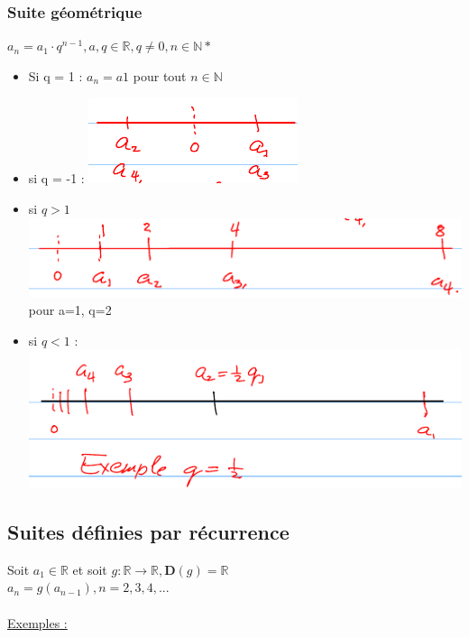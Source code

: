 \documentclass[12pt,a4paper]{article}
\newcommand{\R}{\ensuremath{\mathbb{R}} }
\newcommand{\N}{\ensuremath{\mathbb{N}} }
\begin{document}
{\subsubsection{Suite géométrique}
$a_n = a_1 \cdot q^{n-1}, a,q\in \R, q \neq 0, n\in \mathbb{N*}$
\begin{itemize}
\item Si q = 1 : $a_n = a1$ pour tout $n \in \N$
\item si q = -1 : \includegraphics[scale=0.5]{illustrations_Analyse/suite_geometrique}
\item si $q > 1 $ \includegraphics[scale=0.5]{illustrations_Analyse/suite_geometrique_geq_1} pour a=1, q=2
\item si $q < 1$ : \includegraphics[scale=0.5]{illustrations_Analyse/suite_geometrique_leq_1}
\end{itemize}
\subsection{Suites définies par récurrence}
Soit $a_1 \in \R$ et soit $g : \R \to \R, \mathbf{D}(g) = \R$\\
$a_n = g(a_{n-1}), n = 2,3,4,...$\\
\\
\underline{Exemples :}

}
\end{document}
